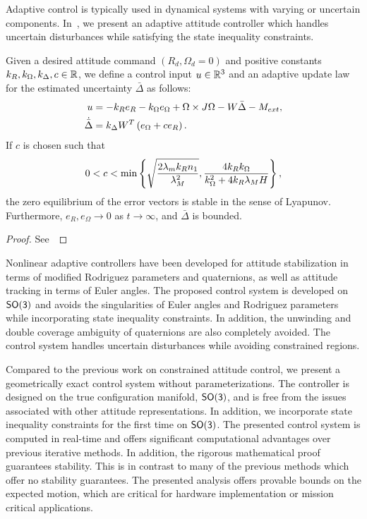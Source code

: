Adaptive control is typically used in dynamical systems with varying or uncertain components.
In~, we present an adaptive attitude controller which handles uncertain disturbances while satisfying the state inequality constraints.
\begin{prop}\label{prop:adaptive_control}
Given  a desired attitude command \( (R_d, \Omega_d = 0 )\) and positive constants \( k_R, k_\Omega, k_\Delta, c \in \mathbb{R} \), we define a control input \( u \in \mathbb{R}^3\) and an adaptive update law for the estimated uncertainty \( \bar{\Delta} \) as follows:
\begin{align}
    u &= - k_R e_R - k_\Omega e_\Omega + \Omega \times J \Omega - W \bar{\Delta} - M_{ext} , \label{eqn:adaptive_control} \\
	\dot{\bar{\Delta}} &= k_\Delta W^T \left( e_\Omega + c e_R \right). \label{eqn:delta_dot}
\end{align}
If \( c \) is chosen such that
\begin{gather}
	0 < c < \min \left\{ \sqrt{\frac{2 \lambda_m k_R n_1}{\lambda_M^2}},
	\frac{4 k_R k_\Omega}{k_\Omega^2 + 4 k_R \lambda_M H} \right\} , \label{eqn:c_bound}
\end{gather}
  the zero equilibrium of the error vectors is stable in the sense of Lyapunov. Furthermore, $e_R,e_\Omega\rightarrow 0$ as $t\rightarrow\infty$, and $\bar\Delta$ is  bounded.
\end{prop}
\begin{proof}
See~
\end{proof}

Nonlinear adaptive controllers have been developed for attitude stabilization in terms of modified Rodriguez parameters and quaternions, as well as attitude tracking in terms of Euler angles. 
The proposed control system is developed on \(\mathsf{SO(3)}\) and avoids the singularities of Euler angles and Rodriguez parameters while incorporating state inequality constraints. 
In addition, the unwinding and double coverage ambiguity of quaternions are also completely avoided. 
The control system handles uncertain disturbances while avoiding constrained regions.

Compared to the previous work on constrained attitude control, we present a geometrically exact control system without parameterizations.
The controller is designed on the true configuration manifold, \( \mathsf{SO(3)} \), and is free from the issues associated with other attitude representations.
In addition, we incorporate state inequality constraints for the first time on \( \mathsf{SO(3)} \).
The presented control system is computed in real-time and offers significant computational advantages over previous iterative methods. 
In addition, the rigorous mathematical proof guarantees stability.
This is in contrast to many of the previous methods which offer no stability guarantees.
The presented analysis offers provable bounds on the expected motion, which are critical for hardware implementation or mission critical applications.

